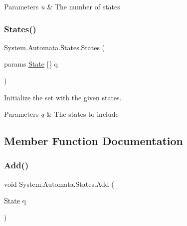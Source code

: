 \begin{DoxyParams}{Parameters}
{\em n} & The number of states\\
\hline
\end{DoxyParams}
\mbox{\label{class_system_1_1_automata_1_1_states_ab1df8e7c0afc82245a5b2138656aad4b}} 
\subsubsection{\texorpdfstring{States()}{States()}\hspace{0.1cm}{\footnotesize\ttfamily [2/2]}}
{\footnotesize\ttfamily System.\+Automata.\+States.\+States (\begin{DoxyParamCaption}\item[{params \mbox{\hyperlink{class_system_1_1_automata_1_1_state}{State}} \mbox{[}$\,$\mbox{]}}]{q }\end{DoxyParamCaption})}



Initialize the set with the given states. 


\begin{DoxyParams}{Parameters}
{\em q} & The states to include\\
\hline
\end{DoxyParams}


\subsection{Member Function Documentation}
\mbox{\label{class_system_1_1_automata_1_1_states_a78c2fd089c3c3c312531d78171fefe4c}} 
\subsubsection{\texorpdfstring{Add()}{Add()}}
{\footnotesize\ttfamily void System.\+Automata.\+States.\+Add (\begin{DoxyParamCaption}\item[{\mbox{\hyperlink{class_system_1_1_automata_1_1_state}{State}}}]{q }\end{DoxyParamCaption})}



